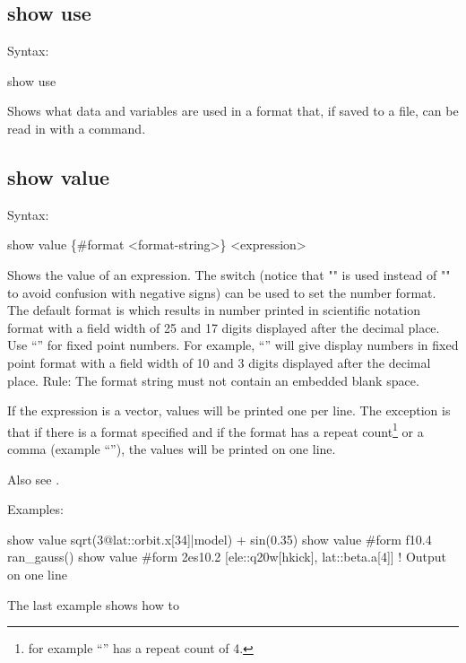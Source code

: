 {{{{{{{{{{{%

\subsection{show use}
\label{s:show.use}

Syntax:
\begin{example}
  show use
\end{example}

Shows what data and variables are used in a format that, if saved to a file, can be read
in with a  command.


\subsection{show value}
\label{s:show.value}

Syntax:
\begin{example}
  show value \{#format <format-string>\} <expression>
\end{example}

Shows the value of an expression. The  switch (notice that "\vn{\#}" is used instead of
"\vn{-}" to avoid confusion with negative signs) can be used to set the number format.  The default
format is  which results in number printed in scientific notation format with a field
width of 25 and 17 digits displayed after the decimal place. Use ``'' for fixed point
numbers. For example, ``'' will give display numbers in fixed point format with a field
width of 10 and 3 digits displayed after the decimal place. Rule: The format string must not contain
an embedded blank space.

If the expression is a vector, values will be printed one per line. The exception is that if there
is a format specified and if the format has a repeat count\footnote
  {
for example ``'' has a repeat count of 4.
  }
or a comma (example ``''), the values will be printed on one line. 


Also see .

Examples:
\begin{example}
  show value sqrt(3@lat::orbit.x[34]|model) + sin(0.35)
  show value #form f10.4 ran_gauss()
  show value #form 2es10.2 [ele::q20w[hkick], lat::beta.a[4]] ! Output on one line
\end{example}
The last example shows how to 


}}}}}}}}}}}
